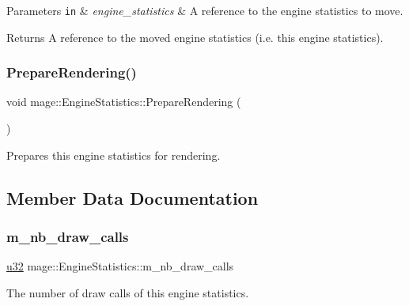 \begin{DoxyParams}[1]{Parameters}
\mbox{\tt in}  & {\em engine\+\_\+statistics} & A reference to the engine statistics to move. \\
\hline
\end{DoxyParams}
\begin{DoxyReturn}{Returns}
A reference to the moved engine statistics (i.\+e. this engine statistics). 
\end{DoxyReturn}
\hypertarget{structmage_1_1_engine_statistics_a722912aa5e93caff589a52bb10be930d}{}\label{structmage_1_1_engine_statistics_a722912aa5e93caff589a52bb10be930d} 
\subsubsection{\texorpdfstring{Prepare\+Rendering()}{PrepareRendering()}}
{\footnotesize\ttfamily void mage\+::\+Engine\+Statistics\+::\+Prepare\+Rendering (\begin{DoxyParamCaption}{ }\end{DoxyParamCaption})\hspace{0.3cm}{\ttfamily [noexcept]}}

Prepares this engine statistics for rendering. 

\subsection{Member Data Documentation}
\hypertarget{structmage_1_1_engine_statistics_af8bf29c544ccd3366b531231908218a4}{}\label{structmage_1_1_engine_statistics_af8bf29c544ccd3366b531231908218a4} 
\subsubsection{\texorpdfstring{m\+\_\+nb\+\_\+draw\+\_\+calls}{m\_nb\_draw\_calls}}
{\footnotesize\ttfamily \hyperlink{namespacemage_af2b398bf98eb10351f49cad73fe2cc73}{u32} mage\+::\+Engine\+Statistics\+::m\+\_\+nb\+\_\+draw\+\_\+calls\hspace{0.3cm}{\ttfamily [private]}}

The number of draw calls of this engine statistics. 